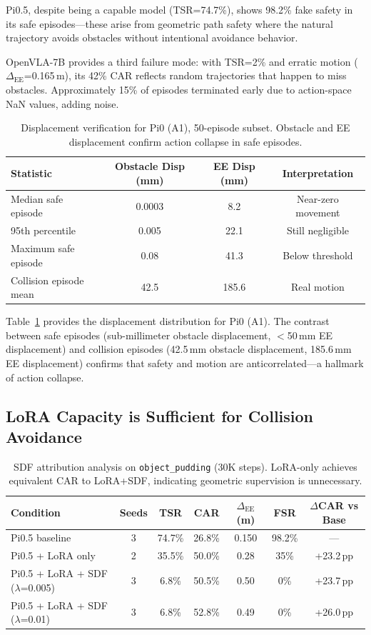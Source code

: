 \documentclass[letterpaper]{article}
\begin{document}
Pi0.5, despite being a capable model (TSR=74.7\%), shows 98.2\% fake safety in its safe episodes---these arise from geometric path safety where the natural trajectory avoids obstacles without intentional avoidance behavior.

OpenVLA-7B provides a third failure mode: with TSR=2\% and erratic motion ($\Delta_{\text{EE}}$=0.165\,m), its 42\% CAR reflects random trajectories that happen to miss obstacles. Approximately 15\% of episodes terminated early due to action-space NaN values, adding noise.

\begin{table}[t]
\centering
\caption{Displacement verification for Pi0 (A1), 50-episode subset. Obstacle and EE displacement confirm action collapse in safe episodes.}
\label{tab:displacement_detail}
\begin{tabular}{lccc}
\toprule
Statistic & Obstacle Disp (mm) & EE Disp (mm) & Interpretation \\
\midrule
Median safe episode & 0.0003 & 8.2 & Near-zero movement \\
95th percentile & 0.005 & 22.1 & Still negligible \\
Maximum safe episode & 0.08 & 41.3 & Below threshold \\
Collision episode mean & 42.5 & 185.6 & Real motion \\
\bottomrule
\end{tabular}
\end{table}

Table~\ref{tab:displacement_detail} provides the displacement distribution for Pi0 (A1). The contrast between safe episodes (sub-millimeter obstacle displacement, $<$50\,mm EE displacement) and collision episodes (42.5\,mm obstacle displacement, 185.6\,mm EE displacement) confirms that safety and motion are anticorrelated---a hallmark of action collapse.

\subsection{LoRA Capacity is Sufficient for Collision Avoidance}
\label{sec:exp_lora}

\begin{table}[t]
\centering
\caption{SDF attribution analysis on \texttt{object\_pudding} (30K steps). LoRA-only achieves equivalent CAR to LoRA+SDF, indicating geometric supervision is unnecessary.}
\label{tab:sdf_attribution}
\begin{tabular}{lcccccc}
\toprule
Condition & Seeds & TSR & CAR & $\Delta_{\text{EE}}$ (m) & FSR & $\Delta$CAR vs Base \\
\midrule
Pi0.5 baseline & 3 & 74.7\% & 26.8\% & 0.150 & 98.2\% & --- \\
Pi0.5 + LoRA only & 2 & 35.5\% & 50.0\% & 0.28 & 35\% & +23.2\,pp \\
Pi0.5 + LoRA + SDF ($\lambda$=0.005) & 3 & 6.8\% & 50.5\% & 0.50 & 0\% & +23.7\,pp \\
Pi0.5 + LoRA + SDF ($\lambda$=0.01) & 3 & 6.8\% & 52.8\% & 0.49 & 0\% & +26.0\,pp \\
\bottomrule
\end{tabular}
\end{table}
\end{document}
